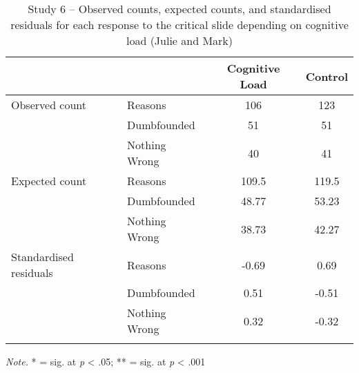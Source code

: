 \documentclass[
  american,
  man,floatsintext]{apa7}
\begin{document}
\begin{table}[tbp]

\begin{center}
\begin{threeparttable}

\caption{\label{tab:tabS6tab1dumbIncest}Study 6 – Observed counts, expected counts, and standardised residuals for each response to the critical slide depending on cognitive load (Julie and Mark)}

\begin{tabular}{llcc}
\toprule
 & \multicolumn{1}{c}{} & \multicolumn{1}{c}{Cognitive Load} & \multicolumn{1}{c}{Control}\\
\midrule
Observed count & Reasons & 106 & 123\\
 & Dumbfounded & 51 & 51\\
 & Nothing Wrong & 40 & 41\\
Expected count & Reasons & 109.5 & 119.5\\
 & Dumbfounded & 48.77 & 53.23\\
 & Nothing Wrong & 38.73 & 42.27\\
Standardised residuals & Reasons & -0.69 & 0.69\\
 & Dumbfounded & 0.51 & -0.51\\
 & Nothing Wrong & 0.32 & -0.32\\
\bottomrule
\addlinespace
\end{tabular}

\begin{tablenotes}[para]
\normalsize{\textit{Note.} * = sig. at \emph{p} < .05; ** = sig. at \emph{p} < .001}
\end{tablenotes}

\end{threeparttable}
\end{center}

\end{table}
\end{document}
